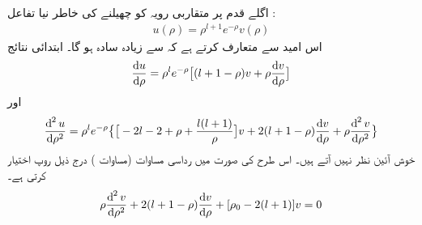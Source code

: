   اگلے قدم پر متقاربی رویہ  کو چھیلنے کی خاطر  نیا تفاعل :
  \begin{align}\label{مساوات_ابعادی_نئی_علامتیت}
u(\rho)=\rho^{l+1}e^{-\rho}v(\rho) 
\end{align}
  اس امید سے متعارف کرتے ہے کہ         سے   زیادہ سادہ ہو گا۔ ابتدائی نتائج 
\begin{align*}
\frac{\dif u}{\dif \rho}=\rho^l e^{-\rho} \big[(l+1-\rho)v+\rho\frac{\dif v}{\dif \rho}\big]
\end{align*}
اور
\begin{align*}
\frac{\dif^{\,2}u}{\dif \rho^2}=\rho^le^{-\rho}\big\{\big[-2l-2+\rho+\frac{l(l+1)}{\rho}\big]v+2(l+1-\rho)\frac{\dif v}{\dif \rho}+\rho\frac{\dif^{\,2}v}{\dif \rho^2}\big\}
\end{align*}
خوش آئین نظر نہیں آتے ہیں۔   اس طرح  کی صورت میں رداسی مساوات (مساوات )   درج ذیل روپ اختیار کرتی ہے۔
  \begin{align}\label{مساوات_ابعادی_رداسی_نئی_روپ}
\rho\frac{\dif^{\,2}{v}}{\dif{\rho^{2}}}+2(l+1-\rho)\frac{\dif{v}}{\dif{\rho}}+[\rho_{0}-2(l+1)]v=0 
\end{align}

